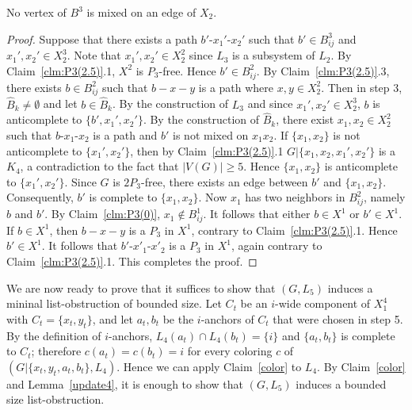 \documentclass[11pt]{article}
\begin{document}
 
 \begin{claim}\label{clm:P3(2)}
 	No vertex of $B^3$ is mixed on an edge of $ X_2 $.
 \end{claim}
 \begin{proof}
 
 	Suppose that there exists a path $ b'$-$x_1'$-$x_2' $ such that $ b' \in B^3_{ij} $ and $ x_1',x_2'\in X^3_2 $. Note that $ x_1',x_2'\in X^2_2 $ since $L_3$ is a subsystem of $L_2$. By Claim~\ref{clm:P3(2.5)}.1, $X^2$ is $P_3$-free. Hence $b'\in B^2_{ij}$. By Claim~\ref{clm:P3(2.5)}.3, there exists $ b \in B^2_{ij} $ such that $ b-x-y $ is a path where $ x, y \in X^2_2 $. Then in step $3$, $ \hat{B}_k \neq \emptyset $ and let $ b\in \hat{B}_k $. 
 	By the construction of $L_3$ and since $ x_1',x_2'\in X^3_2 $, $ b $ is anticomplete to $ \{b',x_1',x_2'\} $.
 	By the construction of $\hat{B}_k $, there exist $ x_1, x_2\in X^2_2 $ such that $ b$-$x_1$-$x_2 $ is a path and $ b' $ is not mixed on $x_1x_2$.
 	If $ \{x_1,x_2\} $ is not anticomplete to $ \{x_1',x_2'\} $, then by Claim~\ref{clm:P3(2.5)}.1 $ G|\{x_1,x_2,x_1',x_2'\}$  is a $K_4$, a contradiction to the fact that $|V(G)|\geq 5$. Hence $ \{x_1,x_2\} $ is anticomplete to $ \{x_1',x_2'\} $. Since $G$ is $2P_3$-free, there exists an edge
 	between $ b' $ and $ \{x_1,x_2\} $. Consequently, $ b' $ is complete to $ \{x_1,x_2\} $.
 	Now $ x_1 $ has two neighbors in $ B^2_{ij} $, namely $ b $ and $ b' $. By Claim~\ref{clm:P3(0)}, $x_1\notin B^1_{ij}$. It follows that either $b\in X^1$ or $b'\in X^1$. If $b\in X^1$, then $b-x-y$ is a $P_3$ in $X^1$, contrary to Claim~\ref{clm:P3(2.5)}.1. Hence $b'\in X^1$. It follows that $b'$-$x'_1$-$x'_2$ is a $P_3$ in $X^1$, again contrary to Claim~\ref{clm:P3(2.5)}.1. This completes the proof.
 \end{proof}
 
We are now ready to prove that it suffices to show that $(G,L_5)$ induces a 
mininal list-obstruction of bounded size.  Let $C_t$ be an $i$-wide component 
of $X_1^4$ with $C_t=\{x_t,y_t\}$, and let $a_t,b_t$ be the $i$-anchors of 
$C_t$ that were  chosen in step 5. By the definition of $i$-anchors, 
$L_4(a_t)\cap L_4(b_t)=\{i\}$ and $\{a_t,b_t\}$ is 
complete to $C_t$; therefore  $c(a_t)=c(b_t)=i$ for every coloring $c$ of 
$ (G|\{x_t,y_t,a_t,b_t\}, L_4)$. Hence we can apply Claim~\ref{color} to 
$L_4$. By Claim~\ref{color} and Lemma~\ref{update4}, it is enough to show that 
$ (G,L_5) $ induces a bounded size list-obstruction.
 
\end{document}
